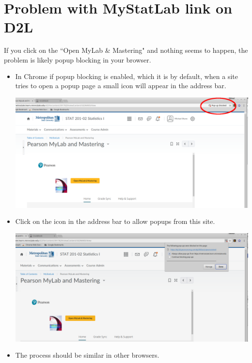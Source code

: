 \documentclass{article}
\begin{document}
\section*{Problem with MyStatLab link on D2L}

If you click on the ``Open MyLab \& Mastering" and nothing seems to happen, the problem is likely popup blocking in your browser.\\

\begin{itemize}
\item In Chrome if popup blocking is enabled, which it is by default, when a site tries to open a popup page a small icon will appear in the address bar.\\

{\centering
\includegraphics[width=5in]{popup_blocked}
\par}
\medskip

\item Click on the icon in the address bar to allow popups from this site.\\

{\centering
\includegraphics[width=5in]{allow_popup}
\par}
\medskip

\item The process should be similar in other browsers.
\end{itemize}
\end{document}
